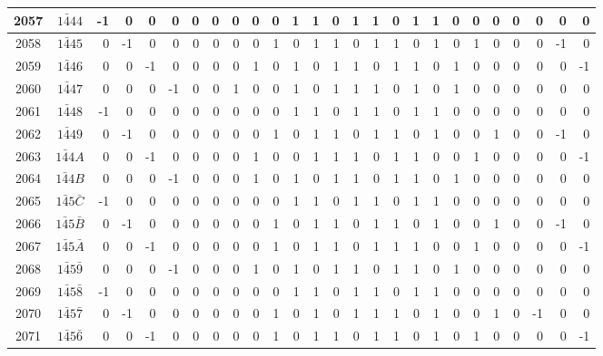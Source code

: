 \documentclass[12 pt]{article}%
\begin{document}
\begin{tiny}
\begin{centering}
\begin{longtable}{|c|c||rrrrrrrrrrrrrrrrrrrrrrrr|}
      \hline
      2057 & $1\bar444$ & -1 & 0 & 0 & 0 & 0 & 0 & 0 & 0 & 0 & 1 & 1 & 0 & 1 & 1 & 0 & 1 & 1 & 0 & 0 & 0 & 0 & 0 & 0 & 0 \\
      \hline
      2058 & $1\bar445$ & 0 & -1 & 0 & 0 & 0 & 0 & 0 & 0 & 1 & 0 & 1 & 1 & 0 & 1 & 1 & 0 & 1 & 0 & 1 & 0 & 0 & 0 & -1 & 0 \\
      \hline
      2059 & $1\bar446$ & 0 & 0 & -1 & 0 & 0 & 0 & 0 & 1 & 0 & 1 & 0 & 1 & 1 & 0 & 1 & 1 & 0 & 1 & 0 & 0 & 0 & 0 & 0 & -1 \\
      \hline
      2060 & $1\bar447$ & 0 & 0 & 0 & -1 & 0 & 0 & 1 & 0 & 0 & 1 & 0 & 1 & 1 & 1 & 0 & 1 & 0 & 1 & 0 & 0 & 0 & 0 & 0 & 0 \\
      \hline
      2061 & $1\bar448$ & -1 & 0 & 0 & 0 & 0 & 0 & 0 & 0 & 0 & 1 & 1 & 0 & 1 & 1 & 0 & 1 & 1 & 0 & 0 & 0 & 0 & 0 & 0 & 0 \\
      \hline
      2062 & $1\bar449$ & 0 & -1 & 0 & 0 & 0 & 0 & 0 & 0 & 1 & 0 & 1 & 1 & 0 & 1 & 1 & 0 & 1 & 0 & 0 & 1 & 0 & 0 & -1 & 0 \\
      \hline
      2063 & $1\bar44A$ & 0 & 0 & -1 & 0 & 0 & 0 & 0 & 1 & 0 & 0 & 1 & 1 & 1 & 0 & 1 & 1 & 0 & 0 & 1 & 0 & 0 & 0 & 0 & -1 \\
      \hline
      2064 & $1\bar44B$ & 0 & 0 & 0 & -1 & 0 & 0 & 0 & 1 & 0 & 1 & 0 & 1 & 1 & 0 & 1 & 1 & 0 & 1 & 0 & 0 & 0 & 0 & 0 & 0 \\
      \hline
      2065 & $1\bar45\bar C$ & -1 & 0 & 0 & 0 & 0 & 0 & 0 & 0 & 0 & 1 & 1 & 0 & 1 & 1 & 0 & 1 & 1 & 0 & 0 & 0 & 0 & 0 & 0 & 0 \\
      \hline
      2066 & $1\bar45\bar B$ & 0 & -1 & 0 & 0 & 0 & 0 & 0 & 0 & 1 & 0 & 1 & 1 & 0 & 1 & 1 & 0 & 1 & 0 & 0 & 1 & 0 & 0 & -1 & 0 \\
      \hline
      2067 & $1\bar45\bar A$ & 0 & 0 & -1 & 0 & 0 & 0 & 0 & 0 & 1 & 0 & 1 & 1 & 0 & 1 & 1 & 1 & 0 & 0 & 1 & 0 & 0 & 0 & 0 & -1 \\
      \hline
      2068 & $1\bar45\bar9$ & 0 & 0 & 0 & -1 & 0 & 0 & 0 & 1 & 0 & 1 & 0 & 1 & 1 & 0 & 1 & 1 & 0 & 1 & 0 & 0 & 0 & 0 & 0 & 0 \\
      \hline
      2069 & $1\bar45\bar8$ & -1 & 0 & 0 & 0 & 0 & 0 & 0 & 0 & 0 & 1 & 1 & 0 & 1 & 1 & 0 & 1 & 1 & 0 & 0 & 0 & 0 & 0 & 0 & 0 \\
      \hline
      2070 & $1\bar45\bar7$ & 0 & -1 & 0 & 0 & 0 & 0 & 0 & 0 & 1 & 0 & 1 & 0 & 1 & 1 & 1 & 0 & 1 & 0 & 0 & 1 & 0 & -1 & 0 & 0 \\
      \hline
      2071 & $1\bar45\bar6$ & 0 & 0 & -1 & 0 & 0 & 0 & 0 & 0 & 1 & 0 & 1 & 1 & 0 & 1 & 1 & 0 & 1 & 0 & 1 & 0 & 0 & 0 & 0 & -1 \\

\end{longtable}
\end{centering}
\end{tiny}
\end{document}
